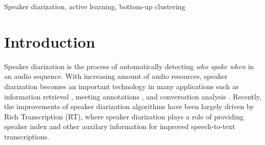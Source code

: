 \documentclass[journal,10pt]{IEEEtran}
\begin{document}
\begin{abstract}




     
\end{abstract}

\begin{IEEEkeywords}
Speaker diarization, active learning, bottom-up clustering
\end{IEEEkeywords}

%
\IEEEpeerreviewmaketitle

\section{Introduction}
\label{intro}
Speaker diarization is the process of automatically detecting \textit{who spoke when }in an audio sequence. With increasing amount of audio resources, speaker diarization becomes an important technology in many applications such as information retrieval \cite{huijbregts2008segmentation}, meeting annotations \cite{anguera2007acoustic,janin2004icsi}, and conversation analysis \cite{vinyals2008towards}. Recently, the improvements of speaker diarization algorithms have been largely driven by Rich Transcription (RT), where speaker diarization plays a role of providing speaker index and other auxilary information for improved speech-to-text transcriptions.
\end{document}
